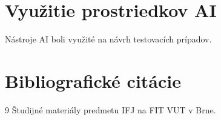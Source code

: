 \section{Využitie prostriedkov AI}
Nástroje AI boli využité na návrh testovacích prípadov.

\section{Bibliografické citácie}
\begin{thebibliography}{9}
     Študijné materiály predmetu IFJ na FIT VUT v Brne.
\end{thebibliography}